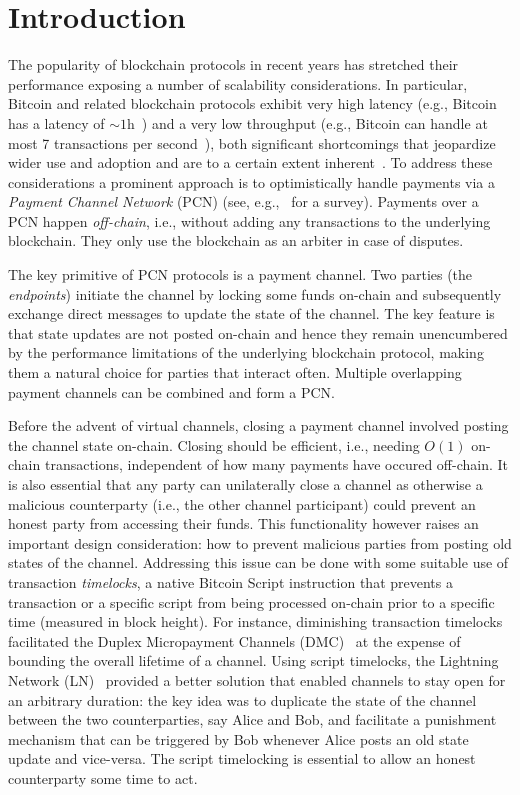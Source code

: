 \section{Introduction}
  The popularity of blockchain protocols in recent years has stretched their
  performance exposing a number of scalability considerations. In particular,
  Bitcoin and related blockchain protocols exhibit very high latency (e.g.,
  Bitcoin has a latency of $\sim{}1$h~\cite{bitcoin}) and a very low throughput (e.g.,
  Bitcoin can handle at most 7 transactions per second~\cite{scaling}), both
  significant shortcomings that jeopardize wider use and adoption and are to a
  certain extent inherent~\cite{scaling}. To address these considerations a
  prominent approach is to optimistically handle payments via a \emph{Payment
  Channel Network} (PCN) (see, e.g.,~\cite{DBLP:conf/fc/GudgeonMRMG20} for a
  survey). Payments over a PCN happen \emph{off-chain}, i.e., without adding any
  transactions to the underlying blockchain. They only use the blockchain as an
  arbiter in case of disputes.

The key primitive of PCN protocols is a payment channel. Two parties (the
\emph{endpoints}) initiate
the channel by locking some funds on-chain and subsequently exchange direct
messages to update the state of the channel. The key feature is that state
updates are not posted on-chain and hence they remain unencumbered by the
performance limitations of the underlying blockchain protocol, making them a
natural choice for parties that interact often. Multiple overlapping payment
channels can be combined and form a PCN.

Before the advent of virtual channels, closing a payment channel involved posting the channel state
on-chain. Closing should be efficient, i.e., needing $O(1)$ on-chain
transactions, independent of how many payments have occured off-chain.
It is also essential that any party can unilaterally close a channel as
otherwise a malicious counterparty (i.e., the other channel participant) could
prevent an honest party from accessing their funds. This functionality however
raises an important design consideration: how to prevent malicious parties from
posting old states of the channel.
%
Addressing this issue can be done with some suitable use of transaction
\emph{timelocks}, a native Bitcoin Script instruction that prevents a transaction or a specific script from
being processed on-chain prior to a specific time (measured in block height).
%
For instance, diminishing transaction timelocks facilitated the Duplex
Micropayment Channels (DMC)~\cite{decker} at the expense of bounding the overall
lifetime of a channel. Using script timelocks, the Lightning Network
(LN)~\cite{lightning} provided a better solution that enabled channels to stay
open for an arbitrary duration: the key idea was to duplicate the state of the
channel between the two counterparties, say Alice and Bob, and facilitate a
punishment mechanism that can be triggered by Bob whenever Alice posts an old
state update and vice-versa. The script timelocking is essential to allow an
honest counterparty some time to act.

